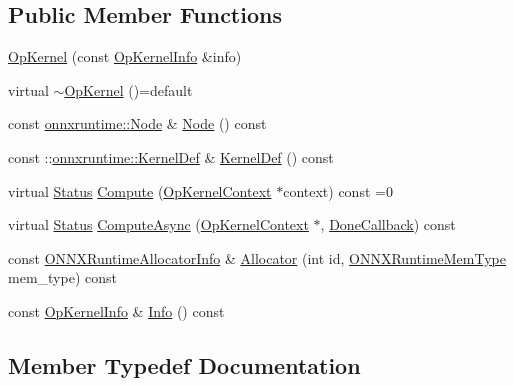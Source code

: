 \subsection*{Public Member Functions}
\begin{DoxyCompactItemize}
\item 
\mbox{\hyperlink{classonnxruntime_1_1OpKernel_ac52aa827444ff6e04e3eb307ca1c25ff}{Op\+Kernel}} (const \mbox{\hyperlink{classonnxruntime_1_1OpKernelInfo}{Op\+Kernel\+Info}} \&info)
\item 
virtual \mbox{\hyperlink{classonnxruntime_1_1OpKernel_a7c4cd72264d9eddc5363c3d51d14375b}{$\sim$\+Op\+Kernel}} ()=default
\item 
const \mbox{\hyperlink{classonnxruntime_1_1Node}{onnxruntime\+::\+Node}} \& \mbox{\hyperlink{classonnxruntime_1_1OpKernel_a25340750e93643e6f7c6dc959e6b9c35}{Node}} () const
\item 
const \+::\mbox{\hyperlink{classonnxruntime_1_1KernelDef}{onnxruntime\+::\+Kernel\+Def}} \& \mbox{\hyperlink{classonnxruntime_1_1OpKernel_ab0ee459317ba9184f242c904afb2f381}{Kernel\+Def}} () const
\item 
virtual \mbox{\hyperlink{classonnxruntime_1_1common_1_1Status}{Status}} \mbox{\hyperlink{classonnxruntime_1_1OpKernel_a9eca8656a78b1b3ab9d3351a12798650}{Compute}} (\mbox{\hyperlink{classonnxruntime_1_1OpKernelContext}{Op\+Kernel\+Context}} $\ast$context) const =0
\item 
virtual \mbox{\hyperlink{classonnxruntime_1_1common_1_1Status}{Status}} \mbox{\hyperlink{classonnxruntime_1_1OpKernel_a3194116c5df2743d214f83412667f28e}{Compute\+Async}} (\mbox{\hyperlink{classonnxruntime_1_1OpKernelContext}{Op\+Kernel\+Context}} $\ast$, \mbox{\hyperlink{classonnxruntime_1_1OpKernel_adee0f70567925d90c35b3c5b92ee87ac}{Done\+Callback}}) const
\item 
const \mbox{\hyperlink{structONNXRuntimeAllocatorInfo}{O\+N\+N\+X\+Runtime\+Allocator\+Info}} \& \mbox{\hyperlink{classonnxruntime_1_1OpKernel_afca209ed70939b916a5df7c0795391e2}{Allocator}} (int id, \mbox{\hyperlink{allocator__info_8h_add3f8ee3ff93395704abae71c30cab18}{O\+N\+N\+X\+Runtime\+Mem\+Type}} mem\+\_\+type) const
\item 
const \mbox{\hyperlink{classonnxruntime_1_1OpKernelInfo}{Op\+Kernel\+Info}} \& \mbox{\hyperlink{classonnxruntime_1_1OpKernel_a6eaab44623ad2e38113f3411660af9f0}{Info}} () const
\end{DoxyCompactItemize}


\subsection{Member Typedef Documentation}
\mbox{\label{classonnxruntime_1_1OpKernel_adee0f70567925d90c35b3c5b92ee87ac}} 
